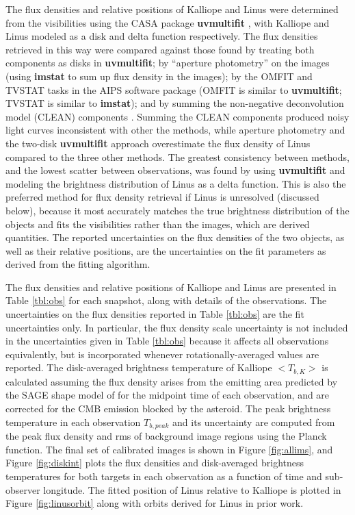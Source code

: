 \documentclass[]{aastex631}
\begin{document}
The flux densities and relative positions of Kalliope and Linus were determined from the visibilities using the CASA package \textbf{uvmultifit} \citep{uvmultifit}, with Kalliope and Linus modeled as a disk and delta function respectively. The flux densities retrieved in this way were compared against those found by treating both components as disks in \textbf{uvmultifit}; by ``aperture photometry'' on the images (using \textbf{imstat} to sum up flux density in the images); by the OMFIT and TVSTAT tasks in the AIPS software package (OMFIT is similar to \textbf{uvmultifit}; TVSTAT is similar to \textbf{imstat}); and by summing the non-negative deconvolution model (CLEAN) components \citep{rau2011}. Summing the CLEAN components produced noisy light curves inconsistent with other the methods, while aperture photometry and the two-disk \textbf{uvmultifit} approach overestimate the flux density of Linus compared to the three other methods. The greatest consistency between methods, and the lowest scatter between observations, was found by using \textbf{uvmultifit} and modeling the brightness distribution of Linus as a delta function. This is also the preferred method for flux density retrieval if Linus is unresolved (discussed below), because it most accurately matches the true brightness distribution of the objects and fits the visibilities rather than the images, which are derived quantities. The reported uncertainties on the flux densities of the two objects, as well as their relative positions, are the uncertainties on the fit parameters as derived from the fitting algorithm. 

The flux densities and relative positions of Kalliope and Linus are presented in Table \ref{tbl:obs} for each snapshot, along with details of the observations. The uncertainties on the flux densities reported in Table \ref{tbl:obs} are the fit uncertainties only. In particular, the flux density scale uncertainty is not included in the uncertainties given in Table \ref{tbl:obs} because it affects all observations equivalently, but is incorporated whenever rotationally-averaged values are reported. The disk-averaged brightness temperature of Kalliope $<T_{b,K}>$ is calculated assuming the flux density arises from the emitting area predicted by the SAGE shape model of \cite{ferrais2022} for the midpoint time of each observation, and are corrected for the CMB emission blocked by the asteroid. The peak brightness temperature in each observation $T_{b,peak}$ and its uncertainty are computed from the peak flux density and rms of background image regions using the Planck function. The final set of calibrated images is shown in Figure \ref{fig:allims}, and Figure \ref{fig:diskint} plots the flux densities and disk-averaged brightness temperatures for both targets in each observation as a function of time and sub-observer longitude. The fitted position of Linus relative to Kalliope is plotted in Figure \ref{fig:linusorbit} along with orbits derived for Linus in prior work.\par
\end{document}

